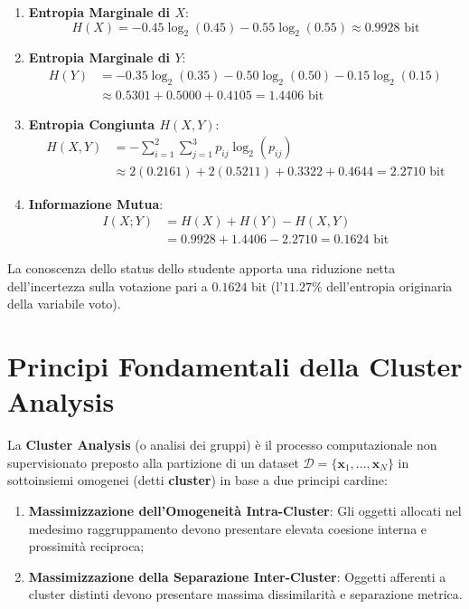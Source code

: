 \begin{enumerate}
    \item \textbf{Entropia Marginale di $X$}:
    \begin{equation}
        H(X) = - 0.45 \log_2(0.45) - 0.55 \log_2(0.55) \approx 0.9928 \text{ bit}
    \end{equation}
    \item \textbf{Entropia Marginale di $Y$}:
    \begin{align}
        H(Y) &= - 0.35 \log_2(0.35) - 0.50 \log_2(0.50) - 0.15 \log_2(0.15) \nonumber \\
        &\approx 0.5301 + 0.5000 + 0.4105 = 1.4406 \text{ bit}
    \end{align}
    \item \textbf{Entropia Congiunta $H(X, Y)$}:
    \begin{align}
        H(X, Y) &= - \sum_{i=1}^2 \sum_{j=1}^3 p_{ij} \log_2(p_{ij}) \nonumber \\
        &\approx 2(0.2161) + 2(0.5211) + 0.3322 + 0.4644 = 2.2710 \text{ bit}
    \end{align}
    \item \textbf{Informazione Mutua}:
    \begin{align}
        I(X; Y) &= H(X) + H(Y) - H(X, Y) \nonumber \\
        &= 0.9928 + 1.4406 - 2.2710 = 0.1624 \text{ bit}
    \end{align}
\end{enumerate}
La conoscenza dello status dello studente apporta una riduzione netta dell'incertezza sulla votazione pari a $0.1624$ bit (l'$11.27\%$ dell'entropia originaria della variabile voto).

\FloatBarrier
\section{Principi Fondamentali della Cluster Analysis}
\label{sec:dm-cluster-analysis-principles}

La \textbf{Cluster Analysis} (o analisi dei gruppi) è il processo computazionale non supervisionato preposto alla partizione di un dataset $\mathcal{D} = \{\mathbf{x}_1, \dots, \mathbf{x}_N\}$ in sottoinsiemi omogenei (detti \textbf{cluster}) in base a due principi cardine:
\begin{enumerate}
    \item \textbf{Massimizzazione dell'Omogeneità Intra-Cluster}: Gli oggetti allocati nel medesimo raggruppamento devono presentare elevata coesione interna e prossimità reciproca;
    \item \textbf{Massimizzazione della Separazione Inter-Cluster}: Oggetti afferenti a cluster distinti devono presentare massima dissimilarità e separazione metrica.
\end{enumerate}

